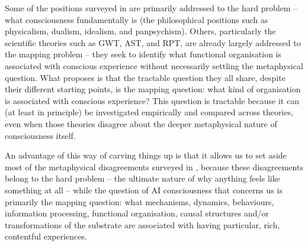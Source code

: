 \documentclass[11pt, a4paper, onecolumn, gdm]{google}
\begin{document}
Some of the positions surveyed in  are primarily addressed to the hard problem -- what consciousness fundamentally is (the philosophical positions such as physicalism, dualism, idealism, and panpsychism).
Others, particularly the scientific theories such as GWT, AST, and RPT, are already largely addressed to the mapping problem -- they seek to identify what functional organisation is associated with conscious experience without necessarily settling the metaphysical question.
What  proposes is that the tractable question they all share, despite their different starting points, is the mapping question: what kind of organisation is associated with conscious experience?
This question is tractable because it can (at least in principle) be investigated empirically and compared across theories, even when those theories disagree about the deeper metaphysical nature of consciousness itself.

An advantage of this way of carving things up is that it allows us to set aside most of the metaphysical disagreements surveyed in , because these disagreements belong to the hard problem -- the ultimate nature of why anything feels like something at all -- while the question of AI consciousness that concerns us is primarily the mapping question: what mechanisms, dynamics, behaviours, information processing, functional organisation, causal structures and/or transformations of the substrate are associated with having particular, rich, contentful experiences.
\end{document}
